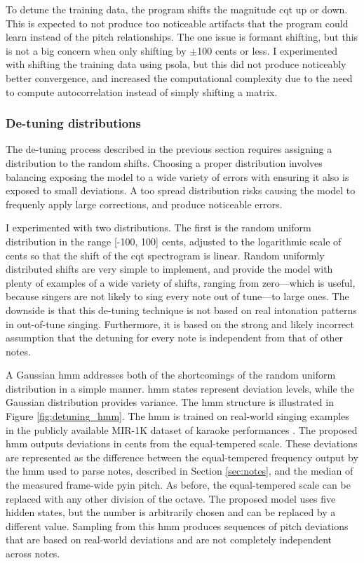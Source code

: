 To detune the training data, the program shifts the magnitude \gls{cqt} up or down. This is expected to not produce too noticeable artifacts that the program could learn instead of the pitch relationships. The one issue is formant shifting, but this is not a big concern when only shifting by $\pm$100 cents or less. I experimented with shifting the training data using \gls{psola}, but this did not produce noticeably better convergence, and increased the computational complexity due to the need to compute autocorrelation instead of simply shifting a matrix. 

\subsubsection{De-tuning distributions}
The de-tuning process described in the previous section requires assigning a distribution to the random shifts. Choosing a proper distribution involves balancing exposing the model to a wide variety of errors with ensuring it also is exposed to small deviations. A too spread distribution risks causing the model to frequenly apply large corrections, and produce noticeable errors. 

I experimented with two distributions. The first is the random uniform distribution in the range [-100, 100] cents, adjusted to the logarithmic scale of cents so that the shift of the \gls{cqt} spectrogram is linear. Random uniformly distributed shifts are very simple to implement, and provide the model with plenty of examples of a wide variety of shifts, ranging from zero---which is useful, because singers are not likely to sing every note out of tune---to large ones. The downside is that this de-tuning technique is not based on real intonation patterns in out-of-tune singing. Furthermore, it is based on the strong and likely incorrect assumption that the detuning for every note is independent from that of other notes.

A Gaussian \gls{hmm} addresses both of the shortcomings of the random uniform distribution in a simple manner. \gls{hmm} states represent deviation levels, while the Gaussian distribution provides variance. The \gls{hmm} structure is illustrated in Figure \ref{fig:detuning_hmm}. The \gls{hmm} is trained on real-world singing examples in the publicly available MIR-1K dataset of karaoke performances \cite{hsu2009improvement}. The proposed \gls{hmm} outputs deviations in cents from the equal-tempered scale. These deviations are represented as the difference between the equal-tempered frequency output by the \gls{hmm} used to parse notes, described in Section \ref{sec:notes}, and the median of the measured frame-wide \gls{pyin} pitch. As before, the equal-tempered scale can be replaced with any other division of the octave. The proposed model uses five hidden states, but the number is arbitrarily chosen and can be replaced by a different value.  Sampling from this \gls{hmm} produces sequences of pitch deviations that are based on real-world deviations and are not completely independent across notes.

